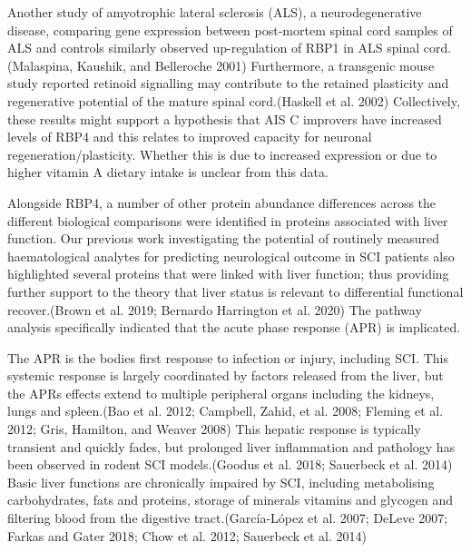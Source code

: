 \documentclass[
]{article}
\begin{document}
\begin{landscape}
\begin{landscape}
Another study of amyotrophic lateral sclerosis (ALS), a neurodegenerative disease, comparing gene expression between post-mortem spinal cord samples of ALS and controls similarly observed up-regulation of RBP1 in ALS spinal cord.(Malaspina, Kaushik, and Belleroche 2001)
Furthermore, a transgenic mouse study reported retinoid signalling may contribute to the retained plasticity and regenerative potential of the mature spinal cord.(Haskell et al. 2002)
Collectively, these results might support a hypothesis that AIS C improvers have increased levels of RBP4 and this relates to improved capacity for neuronal regeneration/plasticity.
Whether this is due to increased expression or due to higher vitamin A dietary intake is unclear from this data.

Alongside RBP4, a number of other protein abundance differences across the different biological comparisons were identified in proteins associated with liver function.
Our previous work investigating the potential of routinely measured haematological analytes for predicting neurological outcome in SCI patients also highlighted several proteins that were linked with liver function; thus providing further support to the theory that liver status is relevant to differential functional recover.(Brown et al. 2019; Bernardo Harrington et al. 2020)
The pathway analysis specifically indicated that the acute phase response (APR) is implicated.

The APR is the bodies first response to infection or injury, including SCI.
This systemic response is largely coordinated by factors released from the liver, but the APRs effects extend to multiple peripheral organs including the kidneys, lungs and spleen.(Bao et al. 2012; Campbell, Zahid, et al. 2008; Fleming et al. 2012; Gris, Hamilton, and Weaver 2008)
This hepatic response is typically transient and quickly fades, but prolonged liver inflammation and pathology has been observed in rodent SCI models.(Goodus et al. 2018; Sauerbeck et al. 2014)
Basic liver functions are chronically impaired by SCI, including metabolising carbohydrates, fats and proteins, storage of minerals vitamins and glycogen and filtering blood from the digestive tract.(García-López et al. 2007; DeLeve 2007; Farkas and Gater 2018; Chow et al. 2012; Sauerbeck et al. 2014)


\end{landscape}
\end{landscape}
\end{document}
